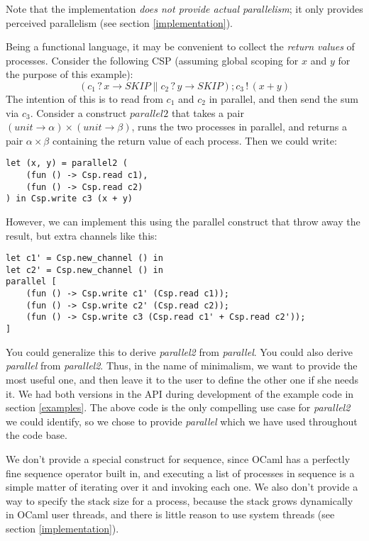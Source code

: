 \documentclass[a4paper,12pt]{article}
\begin{document}
Note that the implementation \emph{does not provide actual parallelism}; it only
provides perceived parallelism (see section \ref{implementation}).

Being a functional language, it may be convenient to collect the \emph{return
values} of processes. Consider the following CSP (assuming global scoping for
$x$ and $y$ for the purpose of this example):
\[(c_1\,?\,x \to SKIP \parallel c_2\,?\,y \to SKIP); c_3\,!\,(x + y)\]
The intention of this is to read from $c_1$ and $c_2$ in parallel, and then
send the sum via $c_3$. Consider a construct $parallel2$ that takes a pair 
$(unit \to \alpha) \times (unit \to \beta)$, runs the two processes in parallel,
and returns a pair $\alpha \times \beta$ containing the return value of each
process. Then we could write:

\begin{verbatim}
let (x, y) = parallel2 (
    (fun () -> Csp.read c1), 
    (fun () -> Csp.read c2)
) in Csp.write c3 (x + y)
\end{verbatim}

However, we can implement this using the parallel construct that throw away
the result, but extra channels like this:

\begin{verbatim}
let c1' = Csp.new_channel () in
let c2' = Csp.new_channel () in
parallel [
    (fun () -> Csp.write c1' (Csp.read c1));
    (fun () -> Csp.write c2' (Csp.read c2));
    (fun () -> Csp.write c3 (Csp.read c1' + Csp.read c2'));
]
\end{verbatim}

You could generalize this to derive \emph{parallel2} from \emph{parallel}. You
could also derive \emph{parallel} from \emph{parallel2}. Thus, in the name of
minimalism, we want to provide the most useful one, and then leave it to the
user to define the other one if she needs it. We had both versions in the API
during development of the example code in section \ref{examples}. The above code
is the only compelling use case for \emph{parallel2} we could identify, so we
chose to provide \emph{parallel} which we have used throughout the code base.

We don't provide a special construct for sequence, since OCaml has a perfectly
fine sequence operator built in, and executing a list of processes in sequence
is a simple matter of iterating over it and invoking each one. We also don't
provide a way to specify the stack size for a process, because the stack grows
dynamically in OCaml user threads, and there is little reason to use system
threads (see section \ref{implementation}).
\end{document}
